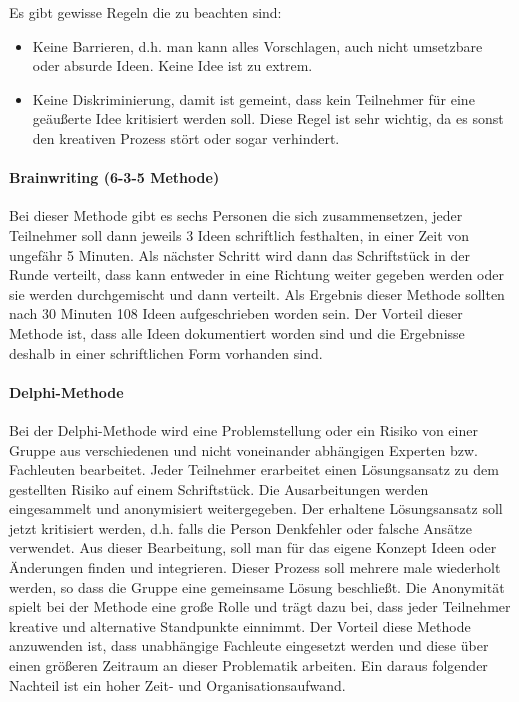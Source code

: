 Es gibt gewisse Regeln die zu beachten sind:
\begin{itemize}
	\item Keine Barrieren, d.h. man kann alles Vorschlagen, auch nicht umsetzbare oder absurde Ideen. Keine Idee ist zu extrem.
	\item Keine Diskriminierung, damit ist gemeint, dass kein Teilnehmer für eine geäußerte Idee kritisiert werden soll. Diese Regel ist sehr wichtig, da es sonst den kreativen Prozess stört oder sogar verhindert.
\end{itemize}

\paragraph{Brainwriting (6-3-5 Methode)}
Bei dieser Methode gibt es sechs Personen die sich zusammensetzen, jeder Teilnehmer soll dann jeweils 3 Ideen schriftlich festhalten, in einer Zeit von ungefähr 5 Minuten.
Als nächster Schritt wird dann das Schriftstück in der Runde verteilt, dass kann entweder in eine Richtung weiter gegeben werden oder sie werden durchgemischt und dann verteilt. 
Als Ergebnis dieser Methode sollten nach 30 Minuten 108 Ideen aufgeschrieben worden sein.
Der Vorteil dieser Methode ist, dass alle Ideen dokumentiert worden sind und die Ergebnisse deshalb in einer schriftlichen Form vorhanden sind.

\paragraph{Delphi-Methode}
Bei der Delphi-Methode wird eine Problemstellung oder ein Risiko von einer Gruppe aus verschiedenen und nicht voneinander abhängigen Experten bzw. Fachleuten bearbeitet. 
Jeder Teilnehmer erarbeitet einen Lösungsansatz zu dem gestellten Risiko auf einem Schriftstück.
Die Ausarbeitungen werden eingesammelt und anonymisiert weitergegeben.
Der erhaltene Lösungsansatz soll jetzt kritisiert werden, d.h. falls die Person Denkfehler oder falsche Ansätze verwendet. Aus dieser Bearbeitung, soll man für das eigene Konzept Ideen oder Änderungen finden und integrieren.
Dieser Prozess soll mehrere male wiederholt werden, so dass die Gruppe eine gemeinsame Lösung beschließt.
Die Anonymität spielt bei der Methode eine große Rolle und trägt dazu bei, dass jeder Teilnehmer kreative und alternative Standpunkte einnimmt.
Der Vorteil diese Methode anzuwenden ist, dass unabhängige Fachleute eingesetzt werden und diese über einen größeren Zeitraum an dieser Problematik arbeiten.
Ein daraus folgender Nachteil ist ein hoher Zeit- und Organisationsaufwand.


